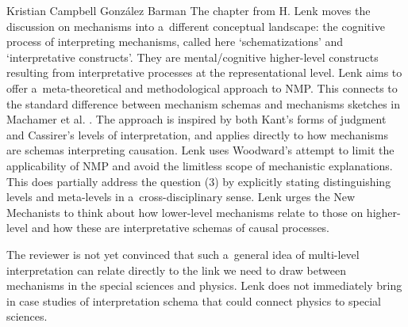 \begin{recengenv}{Kristian Campbell González Barman}
The chapter from H. Lenk moves the discussion on mechanisms into a~different conceptual landscape: the cognitive process of interpreting mechanisms, called here ‘schematizations' and ‘interpretative constructs'. They are mental/cognitive higher-level constructs resulting from interpretative processes at the representational level. Lenk aims to offer a~meta-theoretical and methodological approach to NMP. This connects to the standard difference between mechanism schemas and mechanisms sketches in Machamer et al.
\parencite*[][]{machamer_thinking_2000}. %
 The approach is inspired by both Kant's forms of judgment and Cassirer's levels of interpretation, and applies directly to how mechanisms are schemas interpreting causation. Lenk uses Woodward's 
\parencite*[][]{woodward_mechanistic_2013} %
 attempt to limit the applicability of NMP and avoid the limitless scope of mechanistic explanations. This does partially address the question (3) by explicitly stating distinguishing levels and meta-levels in a~cross-disciplinary sense. Lenk urges the New Mechanists to think about how lower-level mechanisms relate to those on higher-level and how these are interpretative schemas of causal processes.

The reviewer is not yet convinced that such a~general idea of multi-level interpretation can relate directly to the link we need to draw between mechanisms in the special sciences and physics. Lenk does not immediately bring in case studies of interpretation schema that could connect physics to special sciences.


\end{recengenv}
